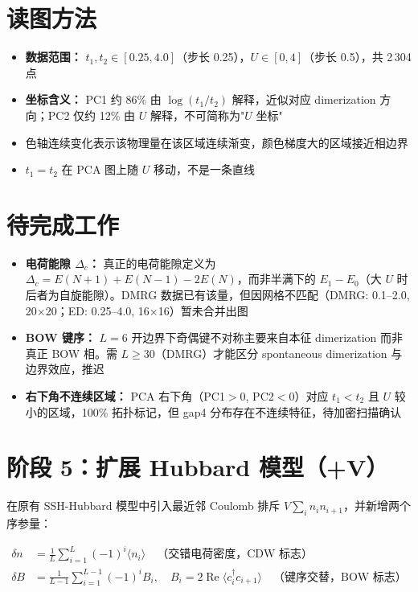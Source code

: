 \documentclass[11pt,a4paper]{article}
\begin{document}
\section{读图方法}

\begin{itemize}
  \item \textbf{数据范围：} $t_1,t_2\in[0.25,4.0]$（步长 0.25），$U\in[0,4]$（步长 0.5），共 2\,304 点
  \item \textbf{坐标含义：} PC1 约 86\% 由 $\log(t_1/t_2)$ 解释，近似对应 dimerization 方向；PC2 仅约 12\% 由 $U$ 解释，不可简称为"$U$ 坐标"
  \item 色轴连续变化表示该物理量在该区域连续渐变，颜色梯度大的区域接近相边界
  \item $t_1=t_2$ 在 PCA 图上随 $U$ 移动，不是一条直线
\end{itemize}

\section{待完成工作}

\begin{itemize}
  \item \textbf{电荷能隙 $\Delta_c$：} 真正的电荷能隙定义为 $\Delta_c = E(N+1) + E(N-1) - 2E(N)$，而非半满下的 $E_1-E_0$（大 $U$ 时后者为自旋能隙）。DMRG 数据已有该量，但因网格不匹配（DMRG: 0.1--2.0, 20$\times$20；ED: 0.25--4.0, 16$\times$16）暂未合并出图
  \item \textbf{BOW 键序：} $L=6$ 开边界下奇偶键不对称主要来自本征 dimerization 而非真正 BOW 相。需 $L\ge 30$（DMRG）才能区分 spontaneous dimerization 与边界效应，推迟
  \item \textbf{右下角不连续区域：} PCA 右下角（PC1$>$0, PC2$<$0）对应 $t_1<t_2$ 且 $U$ 较小的区域，100\% 拓扑标记，但 gap4 分布存在不连续特征，待加密扫描确认
\end{itemize}

\section{阶段 5：扩展 Hubbard 模型（+V）}

在原有 SSH-Hubbard 模型中引入最近邻 Coulomb 排斥 $V\sum_i n_i n_{i+1}$，并新增两个序参量：

\begin{align}
\delta n &= \frac{1}{L}\sum_{i=1}^L (-1)^i \langle n_i \rangle
\quad\text{（交错电荷密度，CDW 标志）} \\
\delta B &= \frac{1}{L-1}\sum_{i=1}^{L-1} (-1)^i B_i,\quad
B_i = 2\operatorname{Re}\langle c^\dagger_i c_{i+1} \rangle
\quad\text{（键序交替，BOW 标志）}
\end{align}
\end{document}
